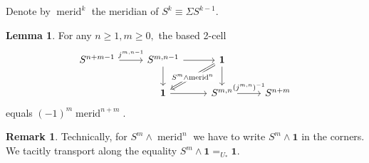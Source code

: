 \documentclass{amsart}
\theoremstyle{definition}
\newtheorem{re}[theorem]{Remark}
\newtheorem{lem}[theorem]{Lemma}
\newcommand{\merid}{\operatorname{merid}}
\newcommand{\sgtn}{\mathbf{1}}
\begin{document}
Denote by $\merid^k$ the meridian of $S^k \equiv \Sigma S^{k-1}$.
\begin{lem}\label{le:Sn-smash-merid}
    For any $n \geq 1, m \geq 0,$ the based 2-cell
    \[\begin{tikzcd}
    	{S^{n+m-1}} & {S^{m,n-1}} & \sgtn \\
    	& \sgtn & {S^{m,n}} & {S^{n+m}}
    	\arrow["{j^{m,n-1}}", from=1-1, to=1-2]
    	\arrow[from=1-2, to=1-3]
    	\arrow[from=1-2, to=2-2]
    	\arrow["{S^m \wedge \merid^n}"{description}, Rightarrow, from=1-3, to=2-2]
    	\arrow[from=1-3, to=2-3]
    	\arrow[from=2-2, to=2-3]
    	\arrow["{({j^{m,n}})^{-1}}", from=2-3, to=2-4]
    \end{tikzcd}\]
    equals $(-1)^{m} \merid^{n+m}$.
\end{lem}
\begin{re}
    Technically, for $S^m \wedge \merid^n$ we have to write $S^m \wedge \sgtn$ in the corners. We tacitly transport along the equality $S^m \wedge \sgtn =_{U_*} \sgtn$.
\end{re}
\end{document}
